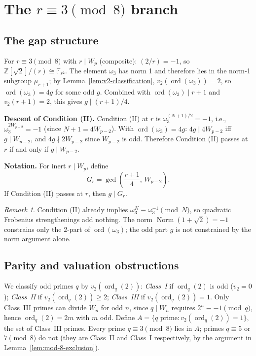 \documentclass[12pt]{article}
\theoremstyle{plain}
\theoremstyle{definition}
\theoremstyle{remark}
\newtheorem{remark}[theorem]{Remark}
\begin{document}
\section{The \texorpdfstring{\(r \equiv 3 \pmod{8}\)}{r == 3 (mod 8)} branch}


\subsection{The gap structure}


For \(r \equiv 3 \pmod{8}\) with \(r \mid W_p\) (composite):
\((2/r) = -1\), so \(\mathbb{Z}[\sqrt{2}]/(r) \cong \mathbb{F}_{r^2}\).
The element \(\omega_3\) has norm 1 and therefore lies in the norm-1
subgroup \(\mu_{r+1}\); by Lemma~\ref{lem:v2-classification},
\(v_2(\operatorname{ord}(\omega_3)) = 2\), so
\(\operatorname{ord}(\omega_3) = 4g\) for some odd \(g\). Combined
with \(\operatorname{ord}(\omega_3) \mid r+1\) and
\(v_2(r+1) = 2\), this gives \(g \mid (r+1)/4\).

\textbf{Descent of Condition (II).} Condition (II) at \(r\) is
\(\omega_3^{(N+1)/2} = -1\), i.e., \(\omega_3^{2W_{p-2}} = -1\)
(since \(N+1 = 4W_{p-2}\)). With \(\operatorname{ord}(\omega_3) = 4g\):
\(4g \mid 4W_{p-2}\) iff \(g \mid W_{p-2}\), and \(4g \nmid 2W_{p-2}\)
since \(W_{p-2}\) is odd. Therefore Condition (II) passes at \(r\)
if and only if \(g \mid W_{p-2}\).

\textbf{Notation.} For inert \(r \mid W_p\), define
\[
G_r = \gcd\!\left(\frac{r+1}{4},\, W_{p-2}\right).
\]
If Condition (II) passes at \(r\), then \(g \mid G_r\).

\begin{remark}\label{rem:frobenius-norm}
Condition (II) already implies
\(\omega_3^N \equiv \omega_3^{-1} \pmod{N}\), so quadratic Frobenius
strengthenings \cite{ref8} add nothing. The norm
\(\operatorname{Norm}(1+\sqrt{2}) = -1\) constrains only the 2-part
of \(\operatorname{ord}(\omega_3)\); the odd part \(g\) is not
constrained by the norm argument alone.
\end{remark}


\subsection{Parity and valuation obstructions}


We classify odd primes \(q\) by \(v_2(\operatorname{ord}_q(2))\):
\emph{Class~I} if \(\operatorname{ord}_q(2)\) is odd (\(v_2 = 0\));
\emph{Class~II} if \(v_2(\operatorname{ord}_q(2)) \geq 2\);
\emph{Class~III} if \(v_2(\operatorname{ord}_q(2)) = 1\). Only
Class~III primes can divide \(W_n\) for odd \(n\), since
\(q \mid W_n\) requires \(2^n \equiv -1 \pmod{q}\), hence
\(\operatorname{ord}_q(2) = 2m\) with \(m\) odd. Define
\(A = \{q \text{ prime} : v_2(\operatorname{ord}_q(2)) = 1\}\),
the set of Class~III primes.
Every prime \(q \equiv 3 \pmod{8}\) lies in \(A\); primes
\(q \equiv 5\) or \(7 \pmod{8}\) do not (they are Class~II and
Class~I respectively, by the argument in Lemma~\ref{lem:mod-8-exclusion}).
\end{document}
